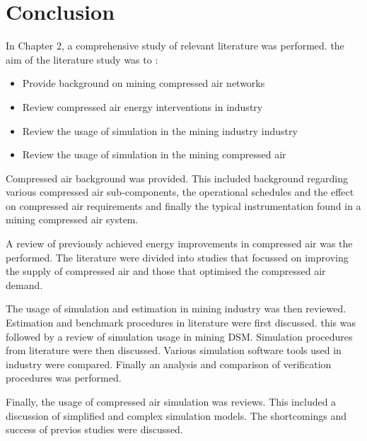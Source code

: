 \section{Conclusion}
In Chapter 2, a comprehensive study of relevant literature was performed. the aim of the literature study was to :
\begin{itemize}
	\item Provide background on mining compressed air networks
	\item Review compressed air energy interventions in industry
	\item Review the usage of simulation in the mining industry industry
	\item Review the usage of simulation in the mining compressed air
\end{itemize}
Compressed air background was provided. This included background regarding various compressed air sub-components, the operational schedules and the effect on compressed air requirements  and finally the typical instrumentation found in a mining compressed air system.
\par
A review of previously achieved energy improvements in compressed air was the performed. The literature were divided into studies that focussed on improving the supply of compressed air and those that optimised the compressed air demand.
\par
The usage of simulation and estimation in mining industry was then reviewed. Estimation and benchmark procedures in literature were first discussed. this was followed by a review of simulation usage in mining DSM. Simulation procedures from literature were then discussed. Various simulation software tools used in industry were compared. Finally an analysis and comparison of verification procedures was performed.
\par 
	Finally, the usage of compressed air simulation was reviews. This included a discussion of simplified and complex simulation models. The shortcomings and success of previos studies were discussed.